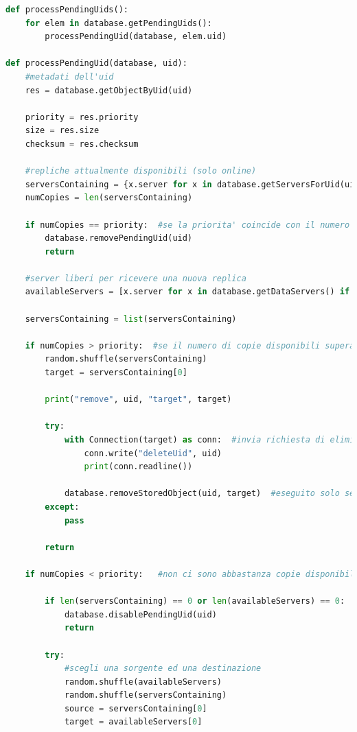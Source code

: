 \documentclass[11pt,a4paper,english]{article}
\begin{document}
\begin{lstlisting}[language=Python, title=Mantenimento del grado di replicazione dei documenti]
def processPendingUids():
    for elem in database.getPendingUids():
        processPendingUid(database, elem.uid)

def processPendingUid(database, uid):
	#metadati dell'uid
    res = database.getObjectByUid(uid)  
    
    priority = res.priority
    size = res.size
    checksum = res.checksum
    
    #repliche attualmente disponibili (solo online)
    serversContaining = {x.server for x in database.getServersForUid(uid)}
    numCopies = len(serversContaining)

    if numCopies == priority:  #se la priorita' coincide con il numero di repliche disponibili non serve fare nulla
        database.removePendingUid(uid)
        return

	#server liberi per ricevere una nuova replica 
	availableServers = [x.server for x in database.getDataServers() if x.server not in serversContaining and x.remaining_capacity > size]
	
	serversContaining = list(serversContaining)

    if numCopies > priority:  #se il numero di copie disponibili supera la priorita' bisogna eliminarne una
        random.shuffle(serversContaining)
        target = serversContaining[0]

        print("remove", uid, "target", target)

        try:
            with Connection(target) as conn:  #invia richiesta di eliminazione al dataserver
                conn.write("deleteUid", uid)
                print(conn.readline())

            database.removeStoredObject(uid, target)  #eseguito solo se la richiesta di eliminazione (connessione) ha avuto successo
        except:
            pass

        return

    if numCopies < priority:   #non ci sono abbastanza copie disponibili

        if len(serversContaining) == 0 or len(availableServers) == 0:   #se non ci sono sorgenti o destinazioni disponibili bisogna attendere
            database.disablePendingUid(uid)
            return

        try:
	        #scegli una sorgente ed una destinazione
	        random.shuffle(availableServers)
	        random.shuffle(serversContaining)
            source = serversContaining[0]
            target = availableServers[0]


\end{lstlisting}
\end{document}

